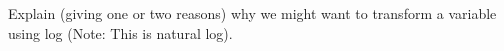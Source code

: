 \item Explain (giving one or two reasons) why we might want to transform a variable using log 
(Note: This is natural log).
